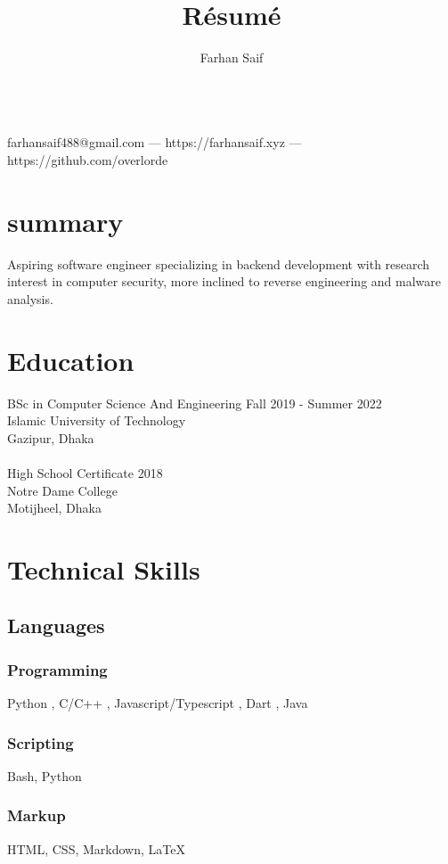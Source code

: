 \documentclass[a4paper,8pt]{extarticle}
\makeatletter
\renewcommand{\maketitle}{
\begin{center}
{\huge\bfseries
\theauthor}
\vspace{0.25em}
\\
	farhansaif488@gmail.com --- https://farhansaif.xyz --- https://github.com/overlorde
\end{center}
}
\makeatother
\begin{document}
\title{R\'esum\'e}

\author{Farhan Saif}

\maketitle

\section{summary}
Aspiring software engineer specializing in backend development with research interest in computer security, more inclined to reverse engineering and malware analysis.

\section{Education}
BSc in Computer Science And Engineering \hspace{6cm} Fall 2019 - Summer 2022\\
Islamic University of Technology\\
Gazipur, Dhaka\\ \\
High School Certificate \hspace{11cm} 2018\\
Notre Dame College\\
Motijheel, Dhaka\\






\section{Technical Skills}
\subsection{Languages }
\subsubsection{Programming}
Python , C/C++ , Javascript/Typescript , Dart , Java
\subsubsection{Scripting}
Bash, Python
\subsubsection{Markup}
HTML, CSS, Markdown, {\LaTeX}
\end{document}
